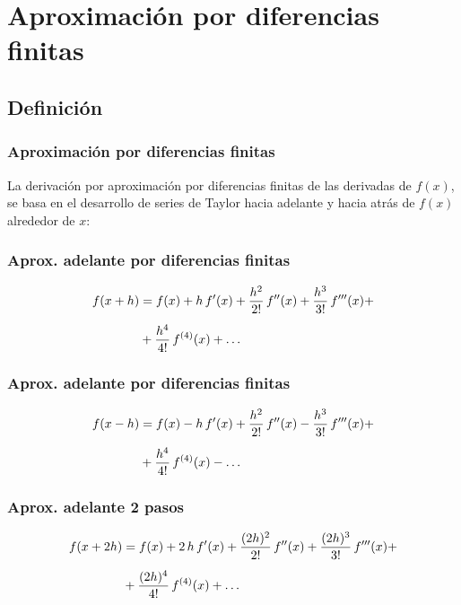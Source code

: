 \documentclass[12pt]{beamer}
\begin{document}
\section{Aproximación por diferencias finitas}
\subsection{Definición}

\begin{frame}
\frametitle{Aproximación por diferencias finitas}
La derivación por aproximación por diferencias finitas de las derivadas de $f (x)$, se basa en el desarrollo de series de Taylor hacia adelante y hacia atrás de $f (x)$ alrededor de $x$:
\end{frame}
\begin{frame}
\frametitle{Aprox. adelante por diferencias finitas}
\begin{eqnarray*}
\begin{aligned}
f (x + h) &= f(x) + h \, {f}^{\prime} (x) + \dfrac{h^{2}}{2!} \, {f}^{\prime \prime} (x) + \dfrac{h^{3}}{3!} \, {f}^{\prime \prime \prime} (x) + \\[0.5em]
&+ \dfrac{h^{4}}{4!} \, f^{(4)} (x) + \ldots
\end{aligned}
\end{eqnarray*}
\end{frame}
\begin{frame}
\frametitle{Aprox. adelante por diferencias finitas}
\begin{eqnarray*}
\begin{aligned}
f (x - h) &= f(x) - h \, {f}^{\prime} (x) + \dfrac{h^{2}}{2!} \, {f}^{\prime \prime} (x) - \dfrac{h^{3}}{3!} \, {f}^{\prime \prime \prime} (x) + \\[0.5em]
&+ \dfrac{h^{4}}{4!} \, f^{(4)}(x) - \ldots
\end{aligned}
\end{eqnarray*}
\end{frame}
\begin{frame}
\frametitle{Aprox. adelante 2 pasos}
\begin{eqnarray*}
\begin{aligned}
f (x + 2 h) &= f(x) + 2 \, h \, {f}^{\prime} (x) + \dfrac{(2 h)^{2}}{2!} \, {f}^{\prime \prime} (x) + \dfrac{(2 h)^{3}}{3!} \, {f}^{\prime \prime \prime} (x) + \\[0.5em]
&+ \dfrac{(2 h)^{4}}{4!} \, f^{(4)}(x) + \ldots
\end{aligned}
\end{eqnarray*}
\end{frame}
\end{document}
